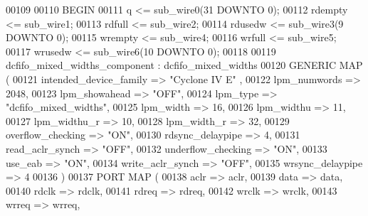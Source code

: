 \begin{DoxyCode}
{00109 
00110 \textcolor{vhdlkeyword}{BEGIN}
00111     \textcolor{vhdlchar}{q}    \textcolor{vhdlchar}{<=} \textcolor{vhdlchar}{sub_wire0}\textcolor{vhdlchar}{(}\textcolor{vhdllogic}{}\textcolor{vhdllogic}{31} \textcolor{keywordflow}{DOWNTO} \textcolor{vhdllogic}{}\textcolor{vhdllogic}{0}\textcolor{vhdlchar}{)};
00112     \textcolor{vhdlchar}{rdempty}    \textcolor{vhdlchar}{<=} \textcolor{vhdlchar}{sub_wire1};
00113     \textcolor{vhdlchar}{rdfull}    \textcolor{vhdlchar}{<=} \textcolor{vhdlchar}{sub_wire2};
00114     \textcolor{vhdlchar}{rdusedw}    \textcolor{vhdlchar}{<=} \textcolor{vhdlchar}{sub_wire3}\textcolor{vhdlchar}{(}\textcolor{vhdllogic}{}\textcolor{vhdllogic}{9} \textcolor{keywordflow}{DOWNTO} \textcolor{vhdllogic}{}\textcolor{vhdllogic}{0}\textcolor{vhdlchar}{)};
00115     \textcolor{vhdlchar}{wrempty}    \textcolor{vhdlchar}{<=} \textcolor{vhdlchar}{sub_wire4};
00116     \textcolor{vhdlchar}{wrfull}    \textcolor{vhdlchar}{<=} \textcolor{vhdlchar}{sub_wire5};
00117     \textcolor{vhdlchar}{wrusedw}    \textcolor{vhdlchar}{<=} \textcolor{vhdlchar}{sub_wire6}\textcolor{vhdlchar}{(}\textcolor{vhdllogic}{}\textcolor{vhdllogic}{10} \textcolor{keywordflow}{DOWNTO} \textcolor{vhdllogic}{}\textcolor{vhdllogic}{0}\textcolor{vhdlchar}{)};
00118 
00119     dcfifo_mixed_widths_component : dcfifo\_mixed\_widths
00120     \textcolor{keywordflow}{GENERIC} \textcolor{keywordflow}{MAP} (
00121         intended\_device\_family => \textcolor{keyword}{"Cyclone IV E"}  ,
00122         lpm\_numwords => \textcolor{vhdllogic}{2048},
00123         lpm\_showahead => \textcolor{keyword}{"OFF"},
00124         lpm\_type => \textcolor{keyword}{"dcfifo\_mixed\_widths"},
00125         lpm\_width => \textcolor{vhdllogic}{16},
00126         lpm\_widthu => \textcolor{vhdllogic}{11},
00127         lpm\_widthu\_r => \textcolor{vhdllogic}{10},
00128         lpm\_width\_r => \textcolor{vhdllogic}{32},
00129         overflow\_checking => \textcolor{keyword}{"ON"},
00130         rdsync\_delaypipe => \textcolor{vhdllogic}{4},
00131         read\_aclr\_synch => \textcolor{keyword}{"OFF"},
00132         underflow\_checking => \textcolor{keyword}{"ON"},
00133         use\_eab => \textcolor{keyword}{"ON"},
00134         write\_aclr\_synch => \textcolor{keyword}{"OFF"},
00135         wrsync\_delaypipe => \textcolor{vhdllogic}{4}
00136     \textcolor{vhdlchar}{)}
00137     \textcolor{keywordflow}{PORT} \textcolor{keywordflow}{MAP} (
00138         aclr => aclr,
00139         data => data,
00140         rdclk => rdclk,
00141         rdreq => rdreq,
00142         wrclk => wrclk,
00143         wrreq => wrreq,
}
\end{DoxyCode}
